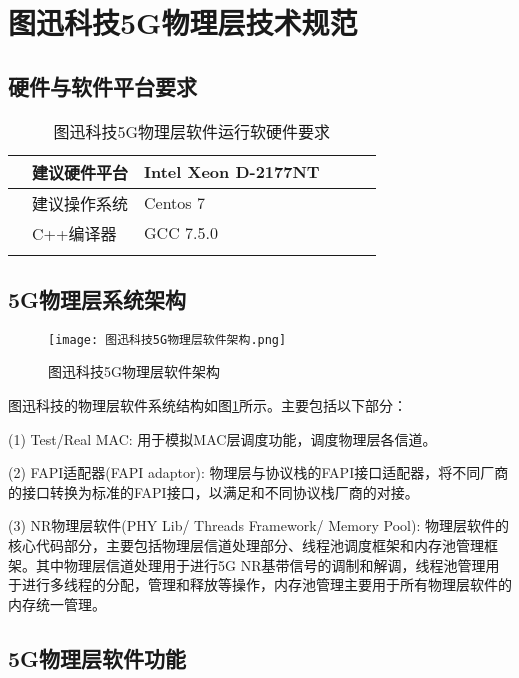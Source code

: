 \section{图迅科技5G物理层技术规范}
\subsection{硬件与软件平台要求}

\begin{table}[htb]
    \centering
    \caption{图迅科技5G物理层软件运行软硬件要求}
    \label{T.example}
    \begin{tabular}{llllll}
        \hline
          & 建议硬件平台   & Intel Xeon D-2177NT \\
        \hline
          & 建议操作系统 & Centos 7 \\
        \hline
          & C++编译器 & GCC 7.5.0 \\
        \hline{}
    \end{tabular}
\end{table}


\subsection{5G物理层系统架构}

\begin{figure}[H]
    \centering
    \texttt{[image: 图迅科技5G物理层软件架构.png]}
    \caption{图迅科技5G物理层软件架构}
    \label{F.1_1}
\end{figure}

图迅科技的物理层软件系统结构如图\ref{F.1_1}所示。主要包括以下部分：

(1) Test/Real MAC: 用于模拟MAC层调度功能，调度物理层各信道。

(2) FAPI适配器(FAPI adaptor): 物理层与协议栈的FAPI接口适配器，将不同厂商的接口转换为标准的FAPI接口，以满足和不同协议栈厂商的对接。

(3) NR物理层软件(PHY Lib/ Threads Framework/ Memory Pool): 物理层软件的核心代码部分，主要包括物理层信道处理部分、线程池调度框架和内存池管理框架。其中物理层信道处理用于进行5G NR基带信号的调制和解调，线程池管理用于进行多线程的分配，管理和释放等操作，内存池管理主要用于所有物理层软件的内存统一管理。

\subsection{5G物理层软件功能}
